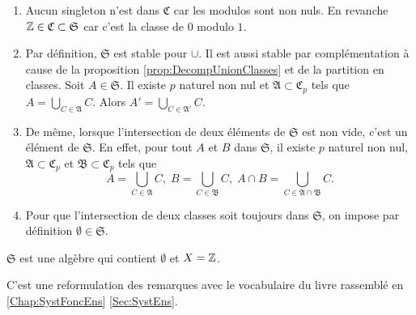 \begin{rems}
 \begin{enumerate}
  \item  Aucun singleton n'est dans $\mathfrak{C}$ car les modulos sont non nuls. En revanche $\mathbb{Z} \in \mathfrak{C} \subset \mathfrak{S}$ car c'est la classe de $0$ modulo $1$.

  \item Par définition, $\mathfrak{S}$ est stable pour $\cup$. Il est aussi stable par complémentation à cause de la proposition \ref{prop:DecompUnionClasses} et de la partition en classes. Soit $A\in \mathfrak{S}$. Il existe $p$ naturel non nul et $\mathfrak{A}\subset \mathfrak{C}_p$ tels que $A = \bigcup_{C \in \mathfrak{A}} C$. Alors $A' = \bigcup_{C \in \mathfrak{A}'} C$.

  \item De même, lorsque l'intersection de deux éléments de $\mathfrak{S}$ est non vide, c'est un élément de $\mathfrak{S}$. En effet, pour tout $A$ et $B$ dans $\mathfrak{S}$, il existe $p$ naturel non nul, $\mathfrak{A}\subset \mathfrak{C}_p$ et $\mathfrak{B}\subset \mathfrak{C}_p$ tels que
  \begin{displaymath}
   A = \bigcup_{C \in \mathfrak{A}} C, \; B = \bigcup_{C \in \mathfrak{B}} C, \; A\cap B = \bigcup_{C \in \mathfrak{A}\cap \mathfrak{B}} C.
  \end{displaymath}

  \item Pour que l'intersection de deux classes soit toujours dans $\mathfrak{S}$, on impose par définition $\emptyset \in \mathfrak{S}$.
\end{enumerate}
\end{rems}

\begin{prop}
  $\mathfrak{S}$ est une algèbre qui contient $\emptyset$ et $X=\mathbb{Z}$.
\end{prop}
\begin{demo}
 C'est une reformulation des remarques avec le vocabulaire du livre rassemblé en \ref{Chap:SystFoncEns} \ref{Sec:SystEns}.
\end{demo}

